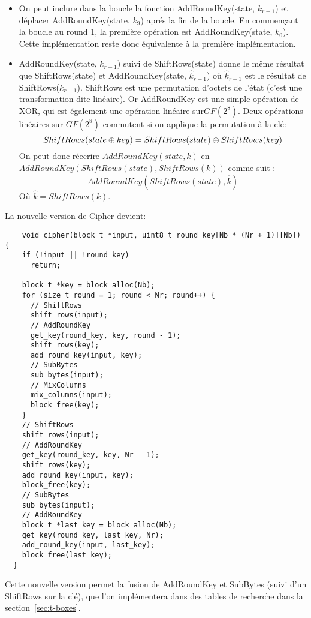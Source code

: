 \documentclass[a4paper, 10pt]{article}
\begin{document}
  \begin{itemize}
    \item On peut inclure dans la boucle la fonction AddRoundKey(state, \(k_{r-1}\)) 
    et déplacer AddRoundKey(state, \(k_{9}\)) aprés la fin de la boucle. En commençant la boucle au round 1, 
    la première opération est AddRoundKey(state, \(k_{0}\)). Cette implémentation reste donc équivalente à la première 
    implémentation.
    \item AddRoundKey(state, \(k_{r-1}\)) suivi de ShiftRows(state) donne le même résultat que
    ShiftRows(state) et AddRoundKey(state, \(\hat{k}_{r-1}\)) où \(\hat{k}_{r-1}\) 
    est le résultat de ShiftRows(\(k_{r-1}\)). ShiftRows est une permutation d'octets de l'état (c'est une transformation dite linéaire). 
    Or AddRoundKey est une simple opération de XOR, qui est également une opération linéaire sur$GF(2^{8})$.
    Deux opérations linéaires sur $GF(2^{8})$ commutent si on applique la permutation à la clé:
    \[
      ShiftRows(state \oplus key) = ShiftRows(state) \oplus ShiftRows(key) \\
    \]
    On peut donc réecrire $AddRoundKey(state, k)$ en \\ $AddRoundKey(ShiftRows(state), ShiftRows(k))$ comme suit :
    \[
      AddRoundKey(ShiftRows(state), \hat{k})
    \]
    Où \(\hat{k} = ShiftRows(k)\).
  \end{itemize}
  La nouvelle version de Cipher devient:
  \small{
    \begin{verbatim}
    void cipher(block_t *input, uint8_t round_key[Nb * (Nr + 1)][Nb]) {
    if (!input || !round_key)
      return;
  
    block_t *key = block_alloc(Nb);
    for (size_t round = 1; round < Nr; round++) {
      // ShiftRows
      shift_rows(input);
      // AddRoundKey
      get_key(round_key, key, round - 1);
      shift_rows(key);
      add_round_key(input, key);
      // SubBytes
      sub_bytes(input);
      // MixColumns
      mix_columns(input);
      block_free(key);
    }
    // ShiftRows
    shift_rows(input);
    // AddRoundKey
    get_key(round_key, key, Nr - 1);
    shift_rows(key);
    add_round_key(input, key);
    block_free(key);
    // SubBytes
    sub_bytes(input);
    // AddRoundKey
    block_t *last_key = block_alloc(Nb);
    get_key(round_key, last_key, Nr);
    add_round_key(input, last_key);
    block_free(last_key);
  }  
    \end{verbatim}
    }
    Cette nouvelle version permet la fusion de AddRoundKey et SubBytes (suivi d'un ShiftRows sur la clé), que l'on implémentera dans des 
    tables de recherche dans la section~\ref{sec:t-boxes}.
\end{document}
